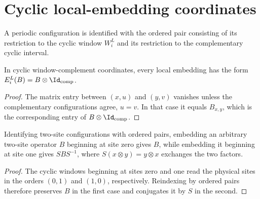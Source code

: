 \section{Cyclic local-embedding coordinates}

\begin{definition}
    \label{def:mpdo_cyclic_window_complement_coordinates}
    \leanok
    A periodic configuration is identified with the ordered pair consisting of
    its restriction to the cyclic window $W_i^L$ and its restriction to the
    complementary cyclic interval.
\end{definition}

\begin{lemma}
    \label{thm:mpdo_cyclic_local_embedding_reindex}
    \leanok
    In cyclic window-complement coordinates, every local embedding has the form
    $E_i^L(B)=B\otimes\Id_{\mathrm{comp}}$.
\end{lemma}

\begin{proof}
    \leanok
    The matrix entry between $(x,u)$ and $(y,v)$ vanishes unless the
    complementary configurations agree, $u=v$. In that case it equals
    $B_{x,y}$, which is the corresponding entry of
    $B\otimes\Id_{\mathrm{comp}}$.
\end{proof}

\begin{lemma}
    \label{thm:mpdo_generic_two_site_translation_identities}
    \leanok
    Identifying two-site configurations with ordered
    pairs, embedding an arbitrary two-site operator $B$ beginning at site zero
    gives $B$, while embedding it beginning at site one gives
    $SBS^{-1}$, where $S(x\otimes y)=y\otimes x$ exchanges the two factors.
\end{lemma}

\begin{proof}
    \leanok
    The cyclic windows beginning at sites zero and one read the physical sites
    in the orders $(0,1)$ and $(1,0)$, respectively. Reindexing by ordered pairs
    therefore preserves $B$ in the first case and conjugates it by $S$ in the
    second.
\end{proof}
